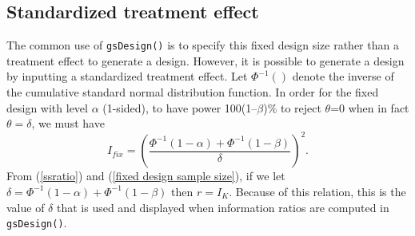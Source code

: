 \subsection{Standardized treatment effect}
The common use of \texttt{gsDesign()} is to specify this fixed design size rather than a treatment effect to generate a design.
However, it is possible to generate a design by inputting a standardized treatment effect.
Let $\Phi^{-1}()$ denote the inverse of
the cumulative standard normal distribution function. In order for the fixed
design with level $\alpha$ (1-sided), to have power 100(1--$\beta$)\% to
reject $\theta$=0 when in fact $\theta=\delta$, we must have
\begin{equation}
I_{fix}=\left(  \frac{\Phi^{-1}(1-\alpha)+\Phi^{-1}(1-\beta)}{\delta}\right)
^{2}.\label{fixed design sample size}%
\end{equation}
From (\ref{ssratio}) and (\ref{fixed design sample size}), if we let
$\delta=\Phi^{-1}(1-\alpha)+\Phi^{-1}(1-\beta)$ then $r=I_{K}$. Because of
this relation, this is the value of $\delta$ that is used and displayed when
information ratios are computed in \texttt{gsDesign()}.

